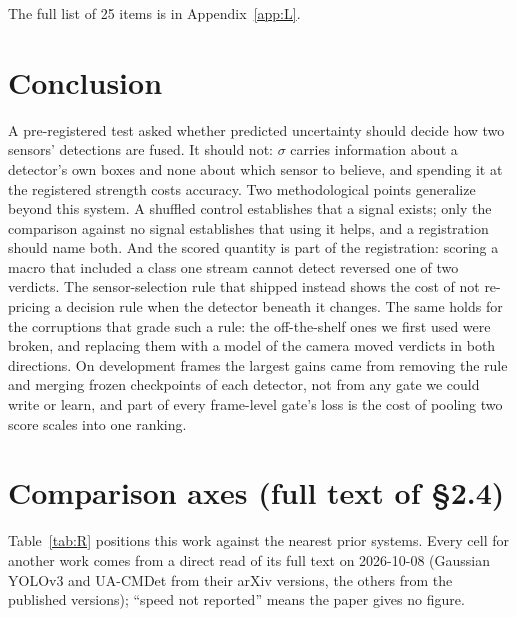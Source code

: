 \documentclass[10pt]{article}
\begin{document}
The full list of 25 items is in Appendix~\ref{app:L}.

\section{Conclusion}\label{sec:10}
A pre-registered test asked whether predicted uncertainty should decide how two sensors' detections are fused. It should not: $\sigma$ carries information about a detector's own boxes and none about which sensor to believe, and spending it at the registered strength costs accuracy. Two methodological points generalize beyond this system. A shuffled control establishes that a signal exists; only the comparison against no signal establishes that using it helps, and a registration should name both. And the scored quantity is part of the registration: scoring a macro that included a class one stream cannot detect reversed one of two verdicts. The sensor-selection rule that shipped instead shows the cost of not re-pricing a decision rule when the detector beneath it changes. The same holds for the corruptions that grade such a rule: the off-the-shelf ones we first used were broken, and replacing them with a model of the camera moved verdicts in both directions. On development frames the largest gains came from removing the rule and merging frozen checkpoints of each detector, not from any gate we could write or learn, and part of every frame-level gate's loss is the cost of pooling two score scales into one ranking.

\FloatBarrier



\appendix
\FloatBarrier
\section{Comparison axes (full text of \S2.4)}\label{app:A}
Table~\ref{tab:R} positions this work against the nearest prior systems. Every cell for another work comes from a direct read of its full text on 2026-10-08 (Gaussian YOLOv3 and UA-CMDet from their arXiv versions, the others from the published versions); ``speed not reported'' means the paper gives no figure.
\end{document}
